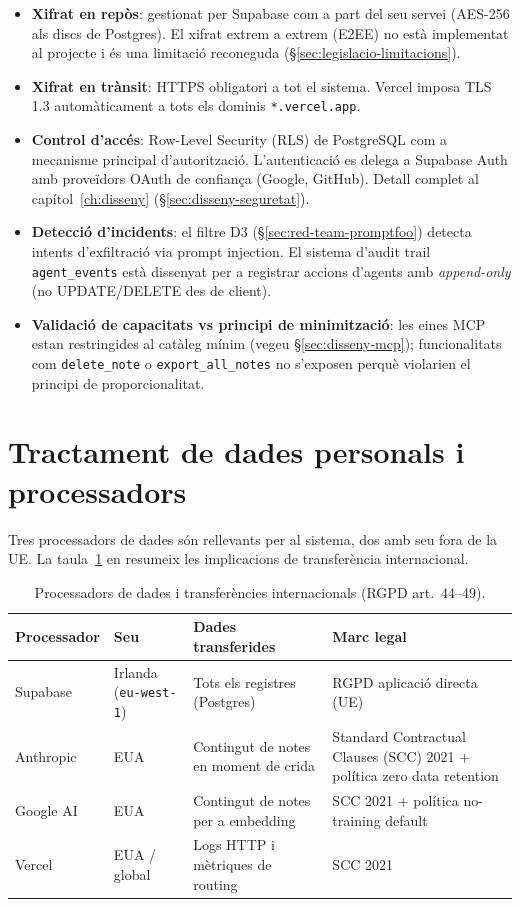 \begin{itemize}
    \item \textbf{Xifrat en repòs}: gestionat per Supabase com a part del seu servei (AES-256 als discs de Postgres). El xifrat extrem a extrem (E2EE) no està implementat al projecte i és una limitació reconeguda (\S\ref{sec:legislacio-limitacions}).
    \item \textbf{Xifrat en trànsit}: HTTPS obligatori a tot el sistema. Vercel imposa TLS 1.3 automàticament a tots els dominis \texttt{*.vercel.app}.
    \item \textbf{Control d'accés}: Row-Level Security (RLS) de PostgreSQL com a mecanisme principal d'autorització. L'autenticació es delega a Supabase Auth amb proveïdors OAuth de confiança (Google, GitHub). Detall complet al capítol~\ref{ch:disseny} (\S\ref{sec:disseny-seguretat}).
    \item \textbf{Detecció d'incidents}: el filtre D3 (\S\ref{sec:red-team-promptfoo}) detecta intents d'exfiltració via prompt injection. El sistema d'audit trail \texttt{agent\_events} està dissenyat per a registrar accions d'agents amb \emph{append-only} (no UPDATE/DELETE des de client).
    \item \textbf{Validació de capacitats vs principi de minimització}: les eines MCP estan restringides al catàleg mínim (vegeu \S\ref{sec:disseny-mcp}); funcionalitats com \texttt{delete\_note} o \texttt{export\_all\_notes} no s'exposen perquè violarien el principi de proporcionalitat.
\end{itemize}

\section{Tractament de dades personals i processadors}
\label{sec:processadors}

Tres processadors de dades són rellevants per al sistema, dos amb seu fora de la UE. La taula~\ref{tab:processadors} en resumeix les implicacions de transferència internacional.

\begin{table}[H]
    \centerfloat
    \footnotesize
    \caption{Processadors de dades i transferències internacionals (RGPD art.~44--49).}
    \label{tab:processadors}
    \begin{tabular}{@{}lll>{\raggedright\arraybackslash}p{4.5cm}@{}}
        \toprule
        Processador & Seu & Dades transferides & Marc legal \\
        \midrule
        Supabase & Irlanda (\texttt{eu-west-1}) & Tots els registres (Postgres) & RGPD aplicació directa (UE) \\
        Anthropic & EUA & Contingut de notes en moment de crida & Standard Contractual Clauses (SCC) 2021 + política zero data retention \\
        Google AI & EUA & Contingut de notes per a embedding & SCC 2021 + política no-training default \\
        Vercel & EUA / global & Logs HTTP i mètriques de routing & SCC 2021 \\
        \bottomrule
    \end{tabular}
\end{table}

